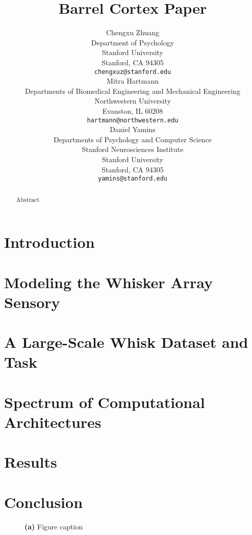 \documentclass{article} %
\title{Barrel Cortex Paper}
\author{
Chengxu Zhuang\\
Department of Psychology\\
Stanford University\\
Stanford, CA 94305 \\
\texttt{chengxuz@stanford.edu} \\
\And
Mitra Hartmann \\
Departments of Biomedical Engineering and Mechanical Engineering \\
Northwestern University \\
Evanston, IL  60208\\
\texttt{hartmann@northwestern.edu} \\
\And
Daniel Yamins \\
Departments of Psychology and Computer Science \\
Stanford Neurosciences Institute \\
Stanford University \\
Stanford, CA 94305 \\
\texttt{yamins@stanford.edu} \\
}
\begin{document}
\maketitle

\begin{abstract}
Abstract
\end{abstract}


\section{Introduction} %


\section{Modeling the Whisker Array Sensory} %


\section{A Large-Scale Whisk Dataset and Task} %


\section{Spectrum of Computational Architectures} %


\section{Results} %


\section{Conclusion}  %


\begin{figure}[h]
\centering
\vspace{-2mm}
\caption{\textbf{(a)} Figure caption~\label{figname}}
\end{figure}


{\small
}

\end{document}
